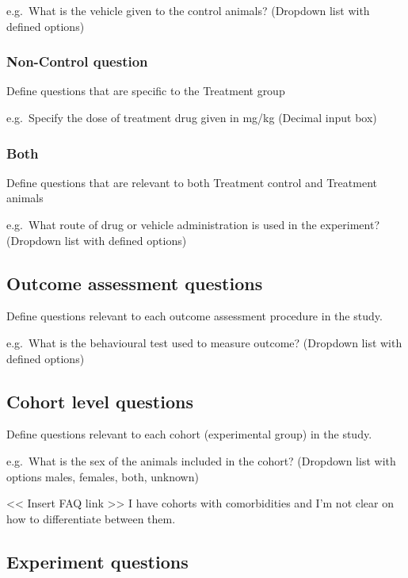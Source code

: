 \documentclass[
]{book}
\begin{document}
e.g.~What is the vehicle given to the control animals?
(Dropdown list with defined options)

\hypertarget{non-control-question-1}{%
\subsubsection{Non-Control question}\label{non-control-question-1}}

Define questions that are specific to the Treatment group

e.g.~Specify the dose of treatment drug given in mg/kg
(Decimal input box)

\hypertarget{both-1}{%
\subsubsection{Both}\label{both-1}}

Define questions that are relevant to both Treatment control and Treatment animals

e.g.~What route of drug or vehicle administration is used in the experiment?
(Dropdown list with defined options)

\hypertarget{outcome-assessment-questions}{%
\subsection{Outcome assessment questions}\label{outcome-assessment-questions}}

Define questions relevant to each outcome assessment procedure in the study.

e.g.~What is the behavioural test used to measure outcome?
(Dropdown list with defined options)

\hypertarget{cohort-level-questions}{%
\subsection{Cohort level questions}\label{cohort-level-questions}}

Define questions relevant to each cohort (experimental group) in the study.

e.g.~What is the sex of the animals included in the cohort?
(Dropdown list with options males, females, both, unknown)

\textless{}\textless{} Insert FAQ link \textgreater{}\textgreater{}
I have cohorts with comorbidities and I'm not clear on how to differentiate between them.

\hypertarget{experiment-questions}{%
\subsection{Experiment questions}\label{experiment-questions}}
\end{document}
